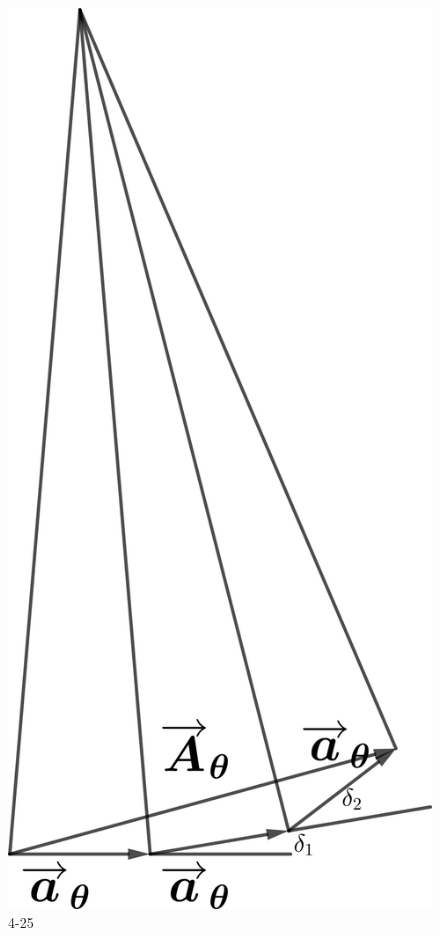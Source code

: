 \documentclass[10pt,a4paper]{article}
\begin{document}
\begin{figure}[h]
\centering
\includegraphics[scale=.1]{OpticsHomework_6_4-25(tailored).png}
\caption{4-25}\label{OpticsHomework_6_4-25}
\end{figure}
\end{document}
